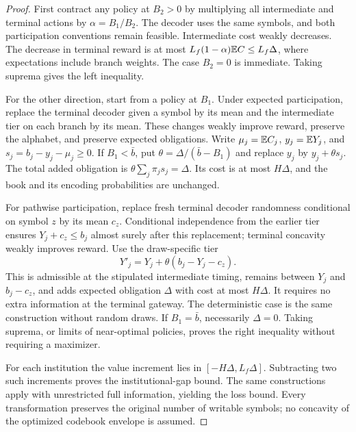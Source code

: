 \begin{proof}
First contract any policy at $B_2>0$ by multiplying all intermediate and terminal actions by $\alpha=B_1/B_2$. The decoder uses the same symbols, and both participation conventions remain feasible. Intermediate cost weakly decreases. The decrease in terminal reward is at most $L_f(1-\alpha)\mathbb E C\leq L_f\Delta$, where expectations include branch weights. The case $B_2=0$ is immediate. Taking suprema gives the left inequality.

For the other direction, start from a policy at $B_1$. Under expected participation, replace the terminal decoder given a symbol by its mean and the intermediate tier on each branch by its mean. These changes weakly improve reward, preserve the alphabet, and preserve expected obligations. Write $\mu_j=\mathbb E C_j$, $y_j=\mathbb E Y_j$, and $s_j=b_j-y_j-\mu_j\geq0$. If $B_1<\bar b$, put $\theta=\Delta/(\bar b-B_1)$ and replace $y_j$ by $y_j+\theta s_j$. The total added obligation is $\theta\sum_j\pi_js_j=\Delta$. Its cost is at most $H\Delta$, and the book and its encoding probabilities are unchanged.

For pathwise participation, replace fresh terminal decoder randomness conditional on symbol $z$ by its mean $c_z$. Conditional independence from the earlier tier ensures $Y_j+c_z\leq b_j$ almost surely after this replacement; terminal concavity weakly improves reward. Use the draw-specific tier
\[
 Y'_j=Y_j+\theta(b_j-Y_j-c_z).
\]
This is admissible at the stipulated intermediate timing, remains between $Y_j$ and $b_j-c_z$, and adds expected obligation $\Delta$ with cost at most $H\Delta$. It requires no extra information at the terminal gateway. The deterministic case is the same construction without random draws. If $B_1=\bar b$, necessarily $\Delta=0$. Taking suprema, or limits of near-optimal policies, proves the right inequality without requiring a maximizer.

For each institution the value increment lies in $[-H\Delta,L_f\Delta]$. Subtracting two such increments proves the institutional-gap bound. The same constructions apply with unrestricted full information, yielding the loss bound. Every transformation preserves the original number of writable symbols; no concavity of the optimized codebook envelope is assumed.
\end{proof}

